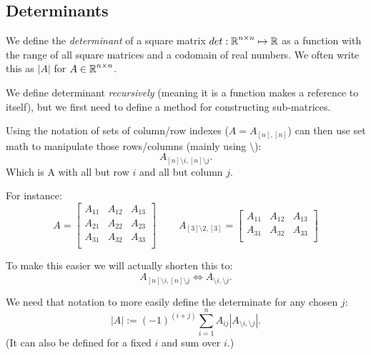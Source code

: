 \subsection{Determinants}
We define the \emph{determinant} of a square matrix $det: \operatorname{\mathbb{R}}^{n\times n} \mapsto \operatorname{\mathbb{R}}$ 
as a function with the range of all square matrices and a codomain of real numbers. 
We often write this as $|A|$ for $A\in\operatorname{\mathbb{R}}^{n\times n}$. 

We define determinant \emph{recursively} (meaning it is a function makes a reference to itself), 
but we first need to define a method for constructing sub-matrices. 

Using the notation of sets of column/row indexes ($A = A_{[n],[n]}$) can then use set math to manipulate those rows/columns (mainly using $\setminus$): 
\[A_{[n]\setminus i,[n]\setminus j}.\]
Which is A with all but row $i$ and all but column $j$. 

For instance: 
\[A = \left[\begin{matrix}A_{11} & A_{12} & A_{13}\\ A_{21} & A_{22} & A_{23}\\ A_{31} & A_{32} & A_{33}\\\end{matrix}\right] \;\;\;\;\;\;\;\;
A_{[3]\setminus 2,[3]} = \left[\begin{matrix}A_{11} & A_{12} & A_{13}\\ A_{31} & A_{32} & A_{33}\\\end{matrix}\right]\]

To make this easier we will actually shorten this to: 
\[A_{[n]\setminus i,[n]\setminus j} \iff A_{\setminus i,\setminus j}.\]

We need that notation to more easily define the determinate for any chosen $j$:
\[
|A| := (-1)^{(i+j)} \sum_{i=1}^n A_{ij} \left|A_{\setminus i,\setminus j}\right|.
\]
(It can also be defined for a fixed $i$ and sum over $i$.)

